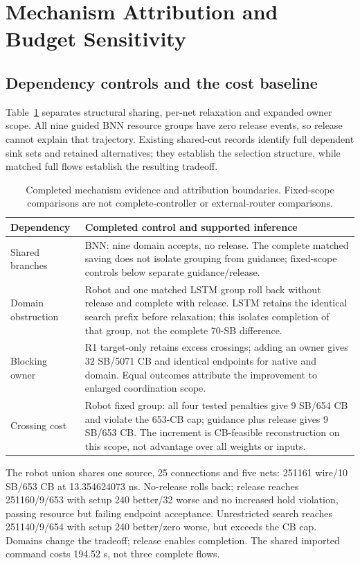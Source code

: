 \documentclass[conference,10pt]{IEEEtran}
\begin{document}
\section{Mechanism Attribution and Budget Sensitivity}
\subsection{Dependency controls and the cost baseline}
Table~\ref{tab:attribution} separates structural sharing, per-net relaxation and expanded owner scope. All nine guided BNN resource groups have zero release events, so release cannot explain that trajectory. Existing shared-cut records identify full dependent sink sets and retained alternatives; they establish the selection structure, while matched full flows establish the resulting tradeoff.

\begin{table}[t]
\centering\footnotesize\setlength{\tabcolsep}{3pt}
\caption{Completed mechanism evidence and attribution boundaries. Fixed-scope comparisons are not complete-controller or external-router comparisons.}
\label{tab:attribution}
\begin{tabular}{p{}p{}}\hline
Dependency & Completed control and supported inference\\\hline
Shared branches & BNN: nine domain accepts, no release. The complete matched saving does not isolate grouping from guidance; fixed-scope controls below separate guidance/release.\\
Domain obstruction & Robot and one matched LSTM group roll back without release and complete with release. LSTM retains the identical search prefix before relaxation; this isolates completion of that group, not the complete 70-SB difference.\\
Blocking owner & R1 target-only retains excess crossings; adding an owner gives 32 SB/5071 CB and identical endpoints for native and domain. Equal outcomes attribute the improvement to enlarged coordination scope.\\
Crossing cost & Robot fixed group: all four tested penalties give 9 SB/654 CB and violate the 653-CB cap; guidance plus release gives 9 SB/653 CB. The increment is CB-feasible reconstruction on this scope, not advantage over all weights or inputs.\\\hline
\end{tabular}
\end{table}

The robot union shares one source, 25 connections and five nets: 251161 wire/10 SB/653 CB at 13.354624073 ns. No-release rolls back; release reaches 251160/9/653 with setup 240 better/32 worse and no increased hold violation, passing resource but failing endpoint acceptance. Unrestricted search reaches 251140/9/654 with setup 240 better/zero worse, but exceeds the CB cap. Domains change the tradeoff; release enables completion. The shared imported command costs 194.52 s, not three complete flows.
\end{document}

